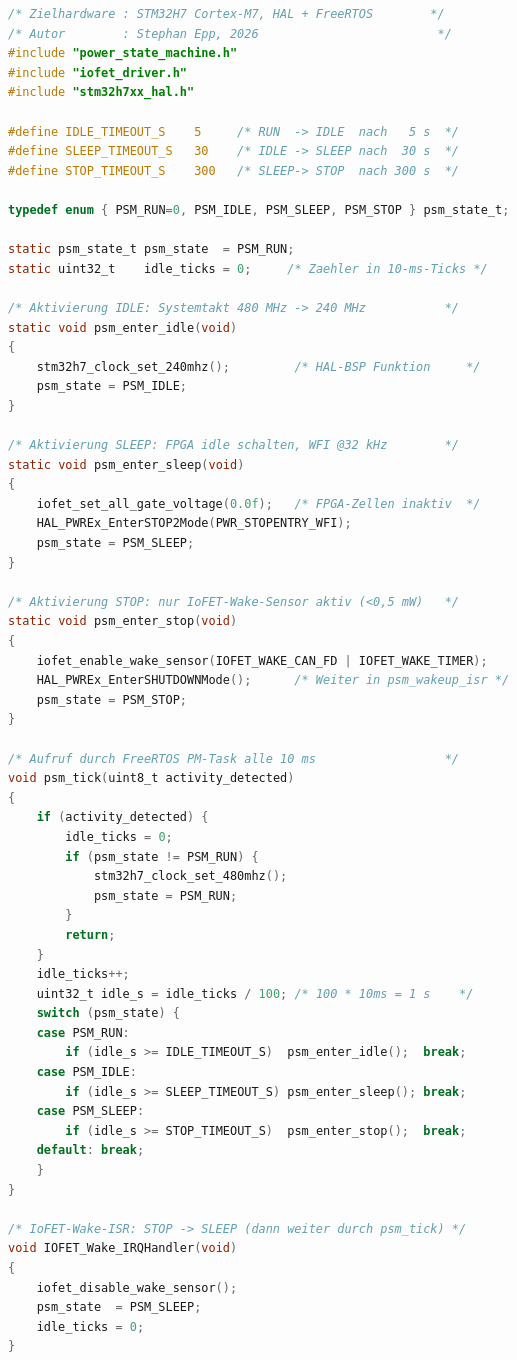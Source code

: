 ﻿\documentclass[a4paper,12pt]{scrreprt}
\theoremstyle{definition}
\begin{document}
\begin{lstlisting}[language=C,
  caption={power\_state\_machine.c -- IoFET-gesteuerte
    Power-State-Machine (RUN/IDLE/SLEEP/STOP) auf STM32H7/FreeRTOS.},
  label={lst:psm}]
/* Zielhardware : STM32H7 Cortex-M7, HAL + FreeRTOS        */
/* Autor        : Stephan Epp, 2026                         */
#include "power_state_machine.h"
#include "iofet_driver.h"
#include "stm32h7xx_hal.h"

#define IDLE_TIMEOUT_S    5     /* RUN  -> IDLE  nach   5 s  */
#define SLEEP_TIMEOUT_S   30    /* IDLE -> SLEEP nach  30 s  */
#define STOP_TIMEOUT_S    300   /* SLEEP-> STOP  nach 300 s  */

typedef enum { PSM_RUN=0, PSM_IDLE, PSM_SLEEP, PSM_STOP } psm_state_t;

static psm_state_t psm_state  = PSM_RUN;
static uint32_t    idle_ticks = 0;     /* Zaehler in 10-ms-Ticks */

/* Aktivierung IDLE: Systemtakt 480 MHz -> 240 MHz           */
static void psm_enter_idle(void)
{
    stm32h7_clock_set_240mhz();         /* HAL-BSP Funktion     */
    psm_state = PSM_IDLE;
}

/* Aktivierung SLEEP: FPGA idle schalten, WFI @32 kHz        */
static void psm_enter_sleep(void)
{
    iofet_set_all_gate_voltage(0.0f);   /* FPGA-Zellen inaktiv  */
    HAL_PWREx_EnterSTOP2Mode(PWR_STOPENTRY_WFI);
    psm_state = PSM_SLEEP;
}

/* Aktivierung STOP: nur IoFET-Wake-Sensor aktiv (<0,5 mW)   */
static void psm_enter_stop(void)
{
    iofet_enable_wake_sensor(IOFET_WAKE_CAN_FD | IOFET_WAKE_TIMER);
    HAL_PWREx_EnterSHUTDOWNMode();      /* Weiter in psm_wakeup_isr */
    psm_state = PSM_STOP;
}

/* Aufruf durch FreeRTOS PM-Task alle 10 ms                  */
void psm_tick(uint8_t activity_detected)
{
    if (activity_detected) {
        idle_ticks = 0;
        if (psm_state != PSM_RUN) {
            stm32h7_clock_set_480mhz();
            psm_state = PSM_RUN;
        }
        return;
    }
    idle_ticks++;
    uint32_t idle_s = idle_ticks / 100; /* 100 * 10ms = 1 s    */
    switch (psm_state) {
    case PSM_RUN:
        if (idle_s >= IDLE_TIMEOUT_S)  psm_enter_idle();  break;
    case PSM_IDLE:
        if (idle_s >= SLEEP_TIMEOUT_S) psm_enter_sleep(); break;
    case PSM_SLEEP:
        if (idle_s >= STOP_TIMEOUT_S)  psm_enter_stop();  break;
    default: break;
    }
}

/* IoFET-Wake-ISR: STOP -> SLEEP (dann weiter durch psm_tick) */
void IOFET_Wake_IRQHandler(void)
{
    iofet_disable_wake_sensor();
    psm_state  = PSM_SLEEP;
    idle_ticks = 0;
}
\end{lstlisting}
\end{document}
